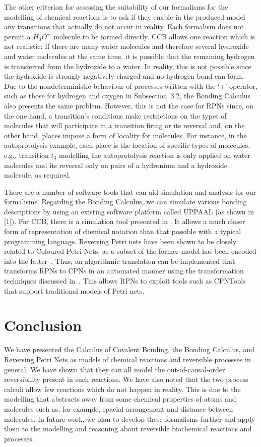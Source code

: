 \documentclass[runningheads]{llncs}
\begin{document}
The other criterion for assessing the suitability of our formalisms for the modelling of chemical reactions
is to ask if they enable in the produced model any transitions that actually do not occur in reality. 
Each formalism does not permit a $H_3O^+$ molecule to be formed directly. CCB allows 
one reaction which is not realistic: 
If there are many water molecules and therefore several hydroxide and water molecules at the same time, 
it is possible that the remaining hydrogen is transferred from the hydroxide to a water. In reality, 
this is not possible since the hydroxide is strongly negatively charged and no hydrogen bond can form.
Due to the nondeterministic behaviour of processes written with the `+' operator, such as those for
hydrogen and oxygen in Subsection~3.2, the Bonding Calculus also presents the same problem.
However, this is not the case for RPNs since, on the one hand, a transition's conditions make restrictions
on the types of molecules
that will participate in a transition firing or its reversal and, on the other hand, places impose a form of locality
for molecules. For instance, in the autoprotolysis example, each place is the location of specific types of molecules,
e.g., transition $t_3$ modelling the autoprotolysis reaction is only applied on water molecules and its reversal
only on pairs of a hydronium and a hydroxide molecule, as required.

There are a number of software tools  that can aid simulation and analysis for our formalisms. Regarding the Bonding Calculus, we can simulate various bonding descriptions by
using an existing software platform called UPPAAL (as shown in [1]). For CCB, there 
is a simulation tool presented in \cite{merevcomp2018}. It allows a much closer form 
of representation of chemical notation than that possible with a typical programming language.
Reversing Petri nets have been shown to be closely related to Coloured Petri Nets, as a subset 
of the former model has been encoded into the latter~\cite{RPNtoCPN}. 
Thus, an algorithmic translation can be implemented that transforms RPNs to CPNs in an automated
manner using the transformation techniques discussed in~\cite{RPNtoCPN}. This allows RPNs to 
exploit tools such as CPNTools that support traditional models of Petri nets. 

\section{Conclusion}
\label{sec:conclusion}
We have presented the Calculus of Covalent Bonding, the Bonding Calculus, and Reversing
Petri Nets as models of chemical reactions and reversible processes in general. We have shown
that they can all model the out-of-causal-order reversibility present in such reactions. We have also noted 
that the two process calculi allow few reactions which do not happen in reality. This is due to 
the modelling that abstracts away from some chemical properties of atoms and molecules such as, for example,
spacial arrangement and distance between molecules. 
In future work, we plan to develop these formalisms further and apply
them to the modelling and reasoning about reversible biochemical reactions and processes.
\end{document}
